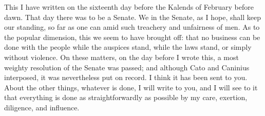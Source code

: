  This I have written on the sixteenth day before the Kalends of February before dawn. That day there was to be a Senate. We in the Senate, as I hope, shall keep our standing, so far as one can amid such treachery and unfairness of men. As to the popular dimension, this we seem to have brought off: that no business can be done with the people while the auspices stand, while the laws stand, or simply without violence. On these matters, on the day before I wrote this, a most weighty resolution of the Senate was passed; and although Cato and Caninius interposed, it was nevertheless put on record. I think it has been sent to you. About the other things, whatever is done, I will write to you, and I will see to it that everything is done as straightforwardly as possible by my care, exertion, diligence, and influence.
